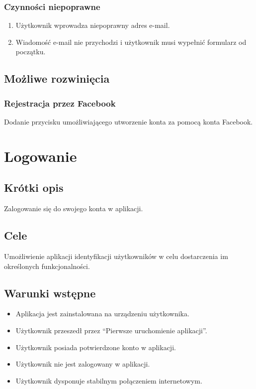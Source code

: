 \documentclass[12pt,a4paper,twoside]{article}
\begin{document}
    \subsubsection{Czynności niepoprawne}
    \begin{enumerate}
        \item Użytkownik wprowadza niepoprawny adres e-mail.
        \item Wiadomość e-mail nie przychodzi i użytkownik musi wypełnić formularz od początku.
    \end{enumerate}


    \subsection{Możliwe rozwinięcia}


    \subsubsection{Rejestracja przez Facebook}
    Dodanie przycisku umożliwiającego utworzenie konta za pomocą konta Facebook.


    \section{Logowanie}


    \subsection{Krótki opis}
    Zalogowanie się do swojego konta w aplikacji.


    \subsection{Cele}
    Umożliwienie aplikacji identyfikacji użytkowników w celu dostarczenia im określonych funkcjonalności.


    \subsection{Warunki wstępne}
    \begin{itemize}
        \item Aplikacja jest zainstalowana na urządzeniu użytkownika.
        \item Użytkownik przeszedł przez ``Pierwsze uruchomienie aplikacji''.
     \item Użytkownik posiada potwierdzone konto w aplikacji.
 \item Użytkownik nie jest zalogowany w aplikacji.
        \item Użytkownik dysponuje stabilnym połączeniem internetowym.
    \end{itemize}
\end{document}
